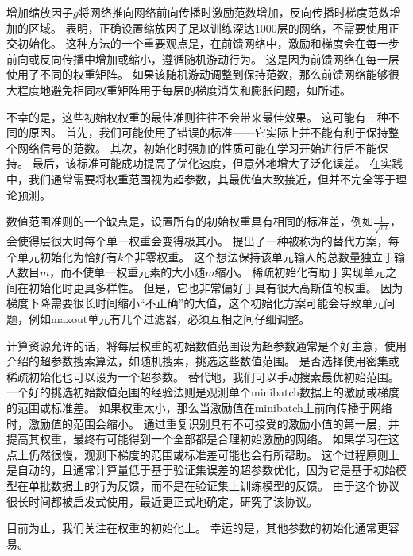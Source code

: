 增加缩放因子$g$将网络推向网络前向传播时激励范数增加，反向传播时梯度范数增加的区域。
\cite{Sussillo14}表明，正确设置缩放因子足以训练深达$1000$层的网络，不需要使用正交初始化。
这种方法的一个重要观点是，在前馈网络中，激励和梯度会在每一步前向或反向传播中增加或缩小，遵循随机游动行为。
这是因为前馈网络在每一层使用了不同的权重矩阵。
如果该随机游动调整到保持范数，那么前馈网络能够很大程度地避免相同权重矩阵用于每层的梯度消失和膨胀问题，如所述。

不幸的是，这些初始权权重的最佳准则往往不会带来最佳效果。
这可能有三种不同的原因。
首先，我们可能使用了错误的标准——它实际上并不能有利于保持整个网络信号的范数。
其次，初始化时强加的性质可能在学习开始进行后不能保持。
最后，该标准可能成功提高了优化速度，但意外地增大了泛化误差。
在实践中，我们通常需要将权重范围视为超参数，其最优值大致接近，但并不完全等于理论预测。


数值范围准则的一个缺点是，设置所有的初始权重具有相同的标准差，例如$\frac{1}{\sqrt{m}}$，会使得层很大时每个单一权重会变得极其小。
\cite{martens2010hessian-small}提出了一种被称为的替代方案，每个单元初始化为恰好有$k$个非零权重。
这个想法保持该单元输入的总数量独立于输入数目$m$，而不使单一权重元素的大小随$m$缩小。
稀疏初始化有助于实现单元之间在初始化时更具多样性。
但是，它也非常偏好于具有很大高斯值的权重。
因为梯度下降需要很长时间缩小``不正确''的大值，这个初始化方案可能会导致单元问题，例如\gls{maxout}单元有几个过滤器，必须互相之间仔细调整。

计算资源允许的话，将每层权重的初始数值范围设为超参数通常是个好主意，使用介绍的超参数搜索算法，如随机搜索，挑选这些数值范围。
是否选择使用密集或稀疏初始化也可以设为一个超参数。
替代地，我们可以手动搜索最优初始范围。
一个好的挑选初始数值范围的经验法则是观测单个\gls{minibatch}数据上的激励或梯度的范围或标准差。
如果权重太小，那么当激励值在\gls{minibatch}上前向传播于网络时，激励值的范围会缩小。
通过重复识别具有不可接受的激励小值的第一层，并提高其权重，最终有可能得到一个全部都是合理初始激励的网络。
如果学习在这点上仍然很慢，观测下梯度的范围或标准差可能也会有所帮助。
这个过程原则上是自动的，且通常计算量低于基于验证集误差的超参数优化，因为它是基于初始模型在单批数据上的行为反馈，而不是在验证集上训练模型的反馈。
由于这个协议很长时间都被启发式使用，最近\cite{mishkin2015all}更正式地确定，研究了该协议。

目前为止，我们关注在权重的初始化上。
幸运的是，其他参数的初始化通常更容易。

